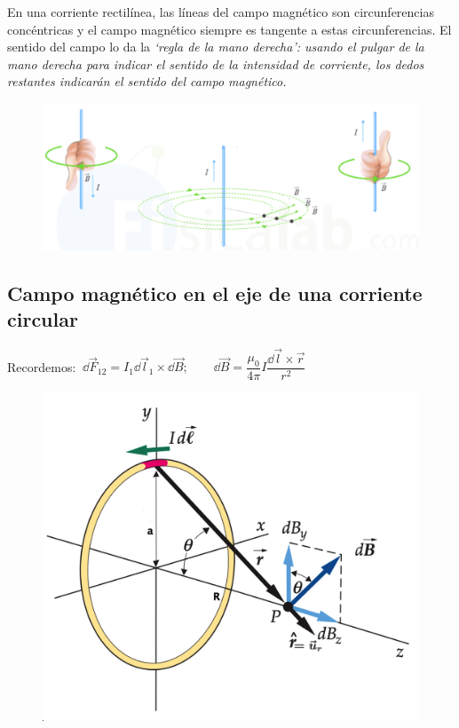 En una corriente rectilínea, las líneas del campo magnético son circunferencias concéntricas y el campo magnético siempre es tangente a estas circunferencias. El sentido del campo lo da la \emph{`regla de la mano derecha': usando el pulgar de la mano derecha para indicar el sentido de la intensidad de corriente, los dedos restantes indicarán el sentido del campo magnético.}


\begin{figure}[H]
	\centering
	\includegraphics[width=.8\textwidth]{imagenes/imagenes26/T26IM07.png}
	\end{figure}

\subsection{Campo magnético en el eje de una corriente circular}

Recordemos: $\ \dd \vec F_{12}=I_1 \dd \vec l_1 \times \dd \vec B;\qquad  \dd \vec B=\dfrac {\mu_0}{4\pi} I \dfrac {\dd \vec l \times \vec r}{r^2}$

\begin{figure}[H]
	\centering
	\includegraphics[width=.75\textwidth]{imagenes/imagenes26/T26IM06.png}
	\end{figure}


